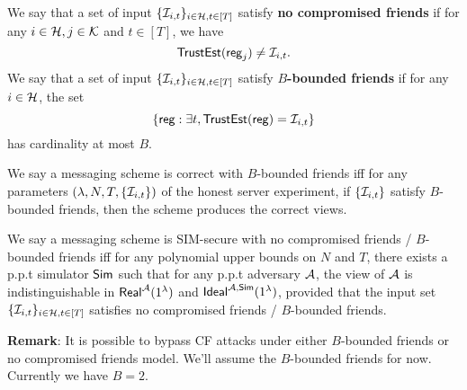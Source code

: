 
\begin{definition}
We say that a set of input $\{\mathcal{I}_{i, t}\}_{i \in \mathcal{H}, t \in [T]}$ satisfy \textbf{no compromised friends} if for any $i \in \mathcal{H}, j \in \mathcal{K}$ and $t \in [T]$, we have
$$\mathsf{TrustEst}(\mathsf{reg}_j) \neq \mathcal{I}_{i, t}.$$
We say that a set of input $\{\mathcal{I}_{i, t}\}_{i \in \mathcal{H}, t \in [T]}$ satisfy \textbf{$B$-bounded friends} if for any $i \in \mathcal{H}$, the set
$$\{\mathsf{reg}: \exists t, \mathsf{TrustEst}(\mathsf{reg}) = \mathcal{I}_{i, t}\}$$
has cardinality at most $B$.

We say a messaging scheme is correct with $B$-bounded friends iff for any parameters $(\lambda, N, T, \{\mathcal{I}_{i, t}\})$ of the honest server experiment, if $\{\mathcal{I}_{i, t}\}$ satisfy $B$-bounded friends, then the scheme produces the correct views.

We say a messaging scheme is SIM-secure with no compromised friends / $B$-bounded friends iff for any polynomial upper bounds on $N$ and $T$, there exists a p.p.t simulator $\mathsf{Sim}$ such that for any p.p.t adversary $\mathcal{A}$, the view of $\mathcal{A}$ is indistinguishable in $\mathsf{Real}^{\mathcal{A}}(1^{\lambda})$ and $\mathsf{Ideal}^{\mathcal{A}, \mathsf{\mathsf{Sim}}}(1^{\lambda})$, provided that the input set $\{\mathcal{I}_{i, t}\}_{i \in \mathcal{H}, t \in [T]}$ satisfies no compromised friends / $B$-bounded friends.
\end{definition}
\textbf{Remark}: It is possible to bypass CF attacks under either $B$-bounded friends or no compromised friends model. We'll assume the $B$-bounded friends for now. Currently we have $B = 2$.